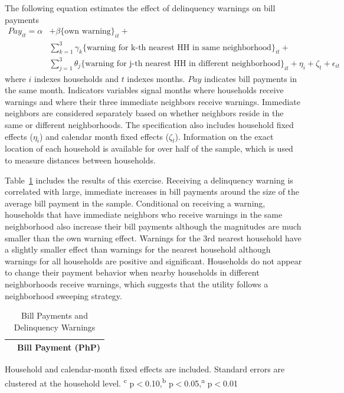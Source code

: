 \documentclass[12pt]{article}
\begin{document}
The following equation estimates the effect of delinquency warnings on bill payments
\begin{align*}
Pay_{it} = \alpha &+ \beta  \{ \text{own warning} \}_{it} + \\
 &\sum_{k=1}^{3} \gamma_k \{ \text{warning for k-th nearest HH in same neighborhood} \}_{it} +  \\
 &\sum_{j=1}^{3} \theta_j \{ \text{warning for j-th nearest HH in different neighborhood} \}_{it} + \eta_i + \zeta_t + \epsilon_{it}
\end{align*}
where $i$ indexes households and $t$ indexes months.  $Pay$ indicates bill payments in the same month.  Indicators variables signal months where households receive warnings and where their three immediate neighbors receive warnings.  Immediate neighbors are considered separately based on whether neighbors reside in the same or different neighborhoods.  The specification also includes household fixed effects ($\eta_i$) and calendar month fixed effects ($\zeta_t$).  Information on the exact location of each household is available for over half of the sample, which is used to measure distances between households.

Table~\ref{table:paywarning} includes the results of this exercise.  Receiving a delinquency warning is correlated with large, immediate increases in bill payments around the size of the average bill payment in the sample.  Conditional on receiving a warning, households that have immediate neighbors who receive warnings in the same neighborhood also increase their bill payments although the magnitudes are much smaller than the own warning effect.  Warnings for the 3rd nearest household have a slightly smaller effect than warnings for the nearest household although warnings for all households are positive and significant.  Households do not appear to change their payment behavior when nearby households in different neighborhoods receive warnings, which suggests that the utility follows a neighborhood sweeping strategy.

\begin{table}[!ht]
\small
\centering
\begin{threeparttable}
\caption{Bill Payments and Delinquency Warnings}\label{table:paywarning}
\vspace{-2mm}
\begin{tabular}{lc}
\toprule
 & \small Bill Payment (PhP) \\[.5em]
 \toprule

\bottomrule
\end{tabular}
\begin{tablenotes}
\footnotesize
\item Household and calendar-month fixed effects are included. Standard errors are clustered at the household level.  \textsuperscript{c} p$<$0.10,\textsuperscript{b} p$<$0.05,\textsuperscript{a} p$<$0.01 
\end{tablenotes}
\end{threeparttable}
\end{table}
\end{document}
